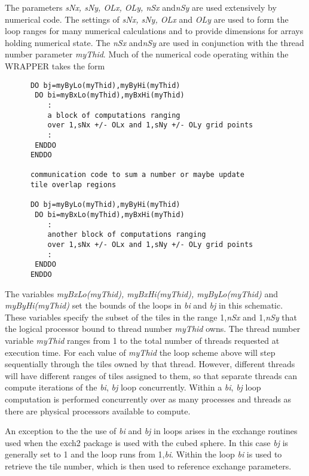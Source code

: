  The parameters {\em sNx, sNy, OLx, OLy, nSx} and{\em nSy} are used extensively by
numerical code. The settings of {\em sNx, sNy, OLx} and {\em OLy}
are used to form the loop ranges for many numerical calculations and
to provide dimensions for arrays holding numerical state.
The {\em nSx} and{\em nSy} are used in conjunction with the thread number
parameter {\em myThid}. Much of the numerical code operating within the
WRAPPER takes the form 
\begin{verbatim}
      DO bj=myByLo(myThid),myByHi(myThid)
       DO bi=myBxLo(myThid),myBxHi(myThid)
          :
          a block of computations ranging 
          over 1,sNx +/- OLx and 1,sNy +/- OLy grid points
          :
       ENDDO
      ENDDO

      communication code to sum a number or maybe update
      tile overlap regions

      DO bj=myByLo(myThid),myByHi(myThid)
       DO bi=myBxLo(myThid),myBxHi(myThid)
          :
          another block of computations ranging 
          over 1,sNx +/- OLx and 1,sNy +/- OLy grid points
          :
       ENDDO
      ENDDO
\end{verbatim}
The variables {\em myBxLo(myThid), myBxHi(myThid), myByLo(myThid)} and {\em
myByHi(myThid)} set the bounds of the loops in {\em bi} and {\em bj} in this 
schematic. These variables specify the subset of the tiles in
the range 1,{\em nSx} and 1,{\em nSy} that the logical processor bound to
thread number {\em myThid} owns. The thread number variable {\em myThid} 
ranges from 1 to the total number of threads requested at execution time.
For each value of {\em myThid} the loop scheme above will step sequentially
through the tiles owned by that thread. However, different threads will
have different ranges of tiles assigned to them, so that separate threads can
compute iterations of the {\em bi}, {\em bj} loop concurrently.
Within a {\em bi}, {\em bj} loop
computation is performed concurrently over as many processes and threads
as there are physical processors available to compute.

An exception to the the use of {\em bi} and {\em bj} in loops arises in the
exchange routines used when the exch2 package is used with the cubed 
sphere.  In this case {\em bj} is generally set to 1 and the loop runs from 
1,{\em bi}.  Within the loop {\em bi} is used to retrieve the tile number,
which is then used to reference exchange parameters.

